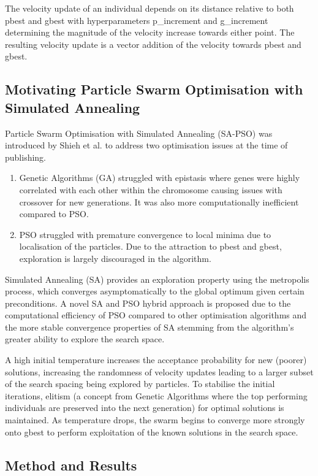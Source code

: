 \documentclass[a4paper, 12pt]{extarticle}
\begin{document}
The velocity update of an individual depends on its distance relative to both pbest and gbest with hyperparameters p\_increment and g\_increment determining the magnitude of the velocity increase towards either point. The resulting velocity update is a vector addition of the velocity towards pbest and gbest.


\subsection{Motivating Particle Swarm Optimisation with Simulated Annealing}

Particle Swarm Optimisation with Simulated Annealing (SA-PSO) was introduced by Shieh et al. \cite{shieh2011modified} to address two optimisation issues at the time of publishing.

\begin{enumerate}
    \item Genetic Algorithms (GA) struggled with epistasis where genes were highly correlated with each other within the chromosome causing issues with crossover for new generations. It was also more computationally inefficient compared to PSO.
    \item PSO struggled with premature convergence to local minima due to localisation of the particles. Due to the attraction to pbest and gbest, exploration is largely discouraged in the algorithm.
\end{enumerate}

Simulated Annealing (SA) provides an exploration property using the metropolis process, which converges asymptomatically to the global optimum given certain preconditions. A novel SA and PSO hybrid approach is proposed due to the computational efficiency of PSO compared to other optimisation algorithms and the more stable convergence properties of SA stemming from the algorithm’s greater ability to explore the search space.

A high initial temperature increases the acceptance probability for new (poorer) solutions, increasing the randomness of velocity updates leading to a larger subset of the search spacing being explored by particles. To stabilise the initial iterations, elitism (a concept from Genetic Algorithms where the top performing individuals are preserved into the next generation) for optimal solutions is maintained. As temperature drops, the swarm begins to converge more strongly onto gbest to perform exploitation of the known solutions in the search space.

\subsection{Method and Results}
\end{document}
